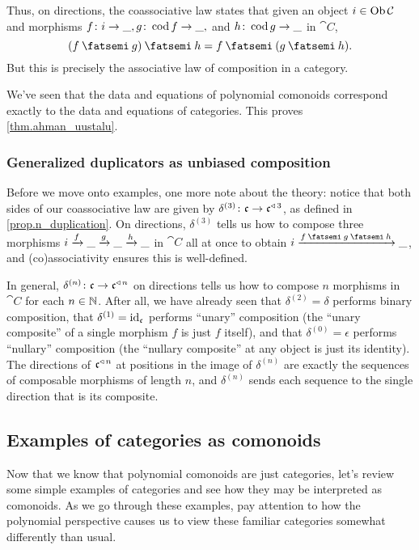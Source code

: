 \documentclass[Book-Poly]{subfiles}
\begin{document}
Thus, on directions, the coassociative law states that given an object $i\in\operatorname{Ob}\mathcal{C}$ and morphisms $f\colon i\to\_, g\colon\operatorname{cod} f\to\_,$ and $h\colon\operatorname{cod} g\to\_$ in $\cat C$,
\[
    (f\then g)\then h = f\then(g\then h).
\]
But this is precisely the associative law of composition in a category.

We've seen that the data and equations of polynomial comonoids correspond exactly to the data and equations of categories.
This proves \cref{thm.ahman_uustalu}.

\subsubsection{Generalized duplicators as unbiased composition}

Before we move onto examples, one more note about the theory: notice that both sides of our coassociative law are given by $\delta^{(3)}\colon\mathfrak{c}\to\mathfrak{c}^{\mathbin{\triangleleft}\,3}$, as defined in \cref{prop.n_duplication}.
On directions, $\delta^{(3)}$ tells us how to compose three morphisms $i\xrightarrow{f}\_\xrightarrow{g}\_\xrightarrow{h}\_$ in $\cat{C}$ all at once to obtain $i\To{f\:\then\:g\:\then\:h}\_$, and (co)associativity ensures this is well-defined.

In general, $\delta^{(n)}\colon\mathfrak{c}\to\mathfrak{c}^{\mathbin{\triangleleft}\,n}$ on directions tells us how to compose $n$ morphisms in $\cat{C}$ for each $n\in\mathbb{N}$.
After all, we have already seen that $\delta^{(2)}=\delta$ performs binary composition, that $\delta^{(1)}=\mathrm{id}_{\mathfrak{c}}$ performs ``unary'' composition (the ``unary composite'' of a single morphism $f$ is just $f$ itself), and that $\delta^{(0)}=\epsilon$ performs ``nullary'' composition (the ``nullary composite'' at any object is just its identity).
The directions of $\mathfrak{c}^{\mathbin{\triangleleft}\,n}$ at positions in the image of $\delta^{(n)}$ are exactly the sequences of composable morphisms of length $n$, and $\delta^{(n)}$ sends each sequence to the single direction that is its composite.

\subsection{Examples of categories as comonoids}
Now that we know that polynomial comonoids are just categories, let's review some simple examples of categories and see how they may be interpreted as comonoids.
As we go through these examples, pay attention to how the polynomial perspective causes us to view these familiar categories somewhat differently than usual.
\end{document}
